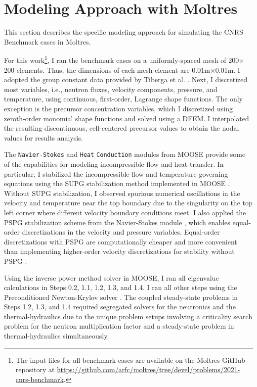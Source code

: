 \section{Modeling Approach with Moltres} \label{sec:model}

This section describes the specific modeling approach for
simulating the CNRS Benchmark cases in Moltres.

For this work\footnote{The input files for
all benchmark
cases are available on the Moltres GitHub repository at 
\url{https://github.com/arfc/moltres/tree/devel/problems/2021-cnrs-benchmark}.
}, I ran the benchmark cases on a uniformly-spaced mesh
of 200$\times$200 elements. Thus, the dimensions of each mesh element are
0.01m$\times$0.01m. I adopted the group constant data
provided by Tiberga et al. \cite{tiberga_results_2020}. Next, I
discretized most variables, i.e., neutron fluxes, velocity
components, pressure, and temperature, using continuous, first-order, Lagrange
shape functions. The only exception is the precursor concentration variables,
which I discretized using zeroth-order monomial shape functions and solved
using a \gls{DFEM}. I interpolated the resulting discontinuous,
cell-centered precursor values to obtain the nodal values for results
analysis.

The
\texttt{Navier-Stokes} and \texttt{Heat} \texttt{Conduction} modules from
\gls{MOOSE} provide some of the capabilities for
modeling incompressible flow and heat transfer. In particular, I stabilized
the incompressible flow and temperature governing equations using the
\gls{SUPG} stabilization method implemented in \gls{MOOSE}
\cite{peterson_overview_2018}. Without \gls{SUPG} stabilization, I
observed spurious numerical oscillations in the velocity and temperature near
the top boundary due to the singularity on the top left corner where different
velocity boundary conditions meet. I also applied the \gls{PSPG} stabilization
scheme \cite{hughes_new_1986} from the Navier-Stokes module
\cite{peterson_overview_2018},
which enables equal-order discretizations in the velocity and pressure
variables. Equal-order discretizations with \gls{PSPG} are computationally
cheaper and more convenient than implementing higher-order
velocity discretizations for stability without \gls{PSPG}
\cite{chapelle_inf-sup_1993}.

Using the inverse power method solver in \gls{MOOSE}, I ran all eigenvalue calculations in
Steps 0.2, 1.1, 1.2, 1.3, and 1.4. I ran all other steps
using the Preconditioned Newton-Krylov solver
\cite{gaston_physics-based_2015}. The coupled steady-state problems in
Steps 1.2, 1.3, and 1.4 required segregated solvers for the neutronics
and the thermal-hydraulics due to the unique problem setups involving a
criticality search problem for the neutron multiplication factor
and a steady-state problem in thermal-hydraulics simultaneously.

